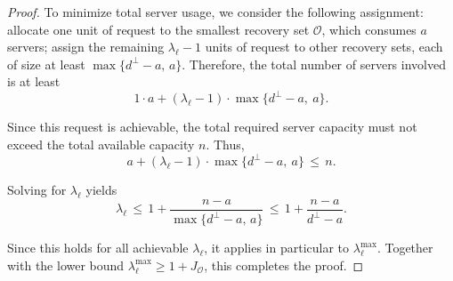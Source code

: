 \documentclass[10pt,a4paper]{amsart}
\begin{document}
\begin{proof}
To minimize total server usage, we consider the following assignment: allocate one unit of request to the smallest recovery set \( \mathcal{O} \), which consumes \( a \) servers; assign the remaining \( \lambda_{\ell} - 1 \) units of request to other recovery sets, each of size at least \( \max\{d^\perp - a,\, a\} \). Therefore, the total number of servers involved is at least
\[
1\cdot a + (\lambda_{\ell} - 1)\cdot\max\{d^\perp - a,\ a\}.
\]

Since this request is achievable, the total required server capacity must not exceed the total available capacity \( n \). Thus,
\[
a + (\lambda_{\ell} - 1)\cdot\max\{d^\perp - a,\ a\} \,\le\, n.
\]

Solving for \( \lambda_{\ell} \) yields
\[
\lambda_{\ell} \,\le\, 1 + \frac{n - a}{\max\{d^\perp - a,\, a\}} \,\le\, 1 + \frac{n - a}{d^\perp - a}.
\]

Since this holds for all achievable \( \lambda_{\ell} \), it applies in particular to \( \lambda_{\ell}^{\max} \). Together with the lower bound \( \lambda_{\ell}^{\max} \ge 1 + J_{\mathcal{O}} \), this completes the proof.
\end{proof}
\end{document}
